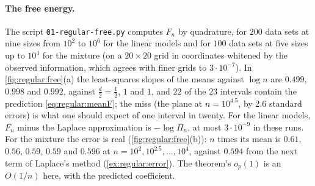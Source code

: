 \begin{refsection}
\paragraph{The free energy.} The script \texttt{01-regular-free.py} computes $F_n$ by quadrature, for $200$ data sets at nine sizes from $10^2$ to $10^6$ for the linear models and for $100$ data sets at five sizes up to $10^4$ for the mixture (on a $20\times20$ grid in coordinates whitened by the observed information, which agrees with finer grids to $3\cdot10^{-7}$). In \cref{fig:regular:free}(a) the least-squares slopes of the means against $\log n$ are $0.499$, $0.998$ and $0.992$, against $\frac d2=\frac12$, $1$ and $1$, and $22$ of the $23$ intervals contain the prediction \eqref{eq:regular:meanF}; the miss (the plane at $n=10^{4.5}$, by $2.6$ standard errors) is what one should expect of one interval in twenty. For the linear models, $F_n$ minus the Laplace approximation is $-\log\Pi_n$, at most $3\cdot10^{-9}$ in these runs. For the mixture the error is real (\cref{fig:regular:free}(b)): $n$ times its mean is $0.61$, $0.56$, $0.59$, $0.59$ and $0.596$ at $n=10^2,10^{2.5},\dots,10^4$, against $0.594$ from the next term of Laplace's method (\cref{ex:regular:error}). The theorem's $o_p(1)$ is an $O(1/n)$ here, with the predicted coefficient.


\end{refsection}
